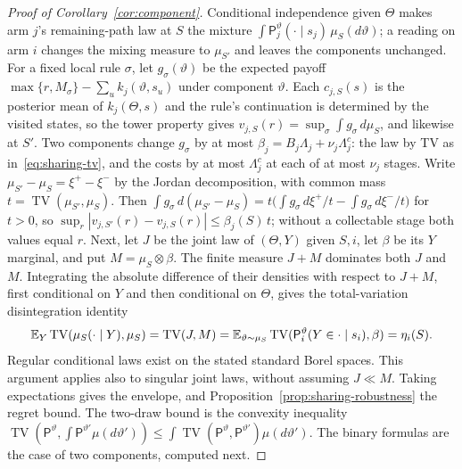 \begin{proof}[Proof of Corollary~\ref{cor:component}]
Conditional independence given $\Theta$ makes arm $j$'s remaining-path law at
$S$ the mixture $\int\mathsf P_j^\vartheta(\cdot\mid s_j)\,\mu_S(d\vartheta)$; a reading on
arm $i$ changes the mixing measure to $\mu_{S'}$ and leaves the components
unchanged. For a fixed local rule $\sigma$, let $g_\sigma(\vartheta)$ be the expected payoff
$\max\{r,M_\sigma\}-\sum_u k_j(\vartheta,s_u)$ under component $\vartheta$. Each $c_{j,S}(s)$ is the posterior mean of $k_j(\Theta,s)$ and the rule's
continuation is determined by the visited states, so the tower property gives
$v_{j,S}(r)=\sup_\sigma\int g_\sigma\,d\mu_S$, and likewise at $S'$. Two components change
$g_\sigma$ by at most $\beta_j=B_j\Lambda_j+\nu_j\Lambda^c_j$: the law by TV as
in~\eqref{eq:sharing-tv}, and the costs by at most $\Lambda^c_j$ at each of at most $\nu_j$
stages. Write $\mu_{S'}-\mu_S=\xi^+-\xi^-$ by the Jordan decomposition, with common mass
$t=\operatorname{TV}(\mu_{S'},\mu_S)$. Then
$\int g_\sigma\,d(\mu_{S'}-\mu_S)=t\bigl(\int g_\sigma\,d\xi^+/t-\int g_\sigma\,d\xi^-/t\bigr)$
for $t>0$, so $\sup_r|v_{j,S'}(r)-v_{j,S}(r)|\le\beta_j(S)\,t$; without a collectable stage
both values equal $r$.
Next, let $J$ be the joint law of $(\Theta,Y)$ given $S,i$, let $\beta$ be
its $Y$ marginal, and put $M=\mu_S\otimes\beta$. The finite measure $J+M$
dominates both $J$ and $M$. Integrating the absolute difference of their
densities with respect to $J+M$, first conditional on $Y$ and then conditional
on $\Theta$, gives the total-variation disintegration identity
\[
 \mathbb{E}_Y\operatorname{TV}(\mu_S(\cdot\mid Y),\mu_S)
 =\operatorname{TV}(J,M)
 =\mathbb{E}_{\vartheta\sim\mu_S}
   \operatorname{TV}(\mathsf P_i^\vartheta(Y\in\cdot\mid s_i),\beta)
 =\eta_i(S).
\]
Regular conditional laws exist on the stated standard Borel spaces.
This argument applies also to singular joint laws, without assuming $J\ll M$.
Taking expectations gives the envelope, and
Proposition~\ref{prop:sharing-robustness} the regret bound. The two-draw bound
is the convexity inequality
$\operatorname{TV}(\mathsf P^\vartheta,\int\mathsf P^{\vartheta'}\mu(d\vartheta'))\le\int\operatorname{TV}(\mathsf P^\vartheta,\mathsf P^{\vartheta'})\mu(d\vartheta')$.
The binary formulas are the case of two components, computed next.
\end{proof}

